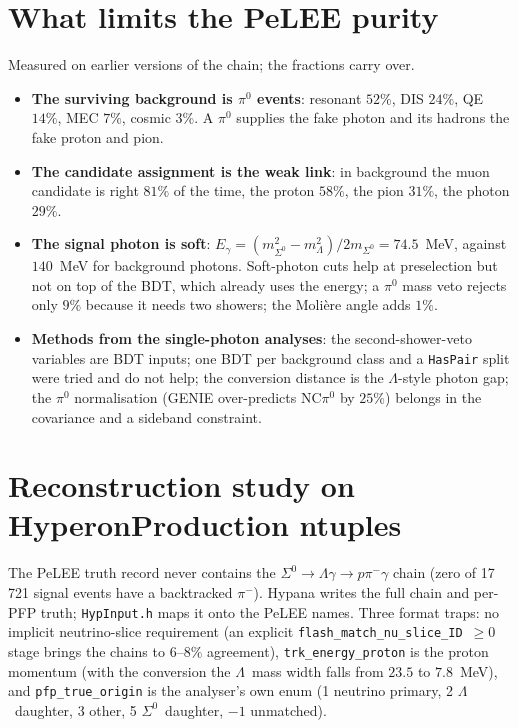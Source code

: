 \documentclass[11pt,a4paper]{article}
\newcommand{\Szero}{\ensuremath{\Sigma^{0}}}
\newcommand{\Lam}{\ensuremath{\Lambda}}
\begin{document}
\section{What limits the PeLEE purity}
\label{app:purity}
Measured on earlier versions of the chain; the fractions carry over.
\begin{itemize}
  \item \textbf{The surviving background is $\pi^0$ events}: resonant $52\%$, DIS $24\%$,
        QE $14\%$, MEC $7\%$, cosmic $3\%$. A $\pi^0$ supplies the fake photon and its
        hadrons the fake proton and pion.
  \item \textbf{The candidate assignment is the weak link}: in background the muon
        candidate is right $81\%$ of the time, the proton $58\%$, the pion $31\%$, the
        photon $29\%$.
  \item \textbf{The signal photon is soft}: $E_\gamma=(m_{\Szero}^2-m_\Lam^2)/2m_{\Szero}=
        74.5$~MeV, against $140$~MeV for background photons. Soft-photon cuts help at
        preselection but not on top of the BDT, which already uses the energy; a $\pi^0$
        mass veto rejects only $9\%$ because it needs two showers; the Moli\`ere angle adds
        $1\%$.
  \item \textbf{Methods from the single-photon analyses}: the second-shower-veto variables
        are BDT inputs; one BDT per background class and a \texttt{HasPair} split were
        tried and do not help; the conversion distance is the \Lam-style photon gap; the
        $\pi^0$ normalisation (GENIE over-predicts NC$\pi^0$ by $25\%$) belongs in the
        covariance and a sideband constraint.
\end{itemize}

\section{Reconstruction study on HyperonProduction ntuples}
\label{app:reco}
The PeLEE truth record never contains the $\Szero\to\Lam\gamma\to p\pi^-\gamma$ chain
(zero of 17\,721 signal events have a backtracked $\pi^-$). Hypana writes the full chain
and per-PFP truth; \texttt{HypInput.h} maps it onto the PeLEE names. Three format traps:
no implicit neutrino-slice requirement (an explicit
\texttt{flash\_match\_nu\_slice\_ID}~$\geq0$ stage brings the chains to $6$--$8\%$
agreement), \texttt{trk\_energy\_proton} is the proton momentum (with the conversion the
\Lam\ mass width falls from $23.5$ to $7.8$~MeV), and \texttt{pfp\_true\_origin} is the
analyser's own enum (1 neutrino primary, 2 \Lam\ daughter, 3 other, 5 \Szero\ daughter,
$-1$ unmatched).
\end{document}

